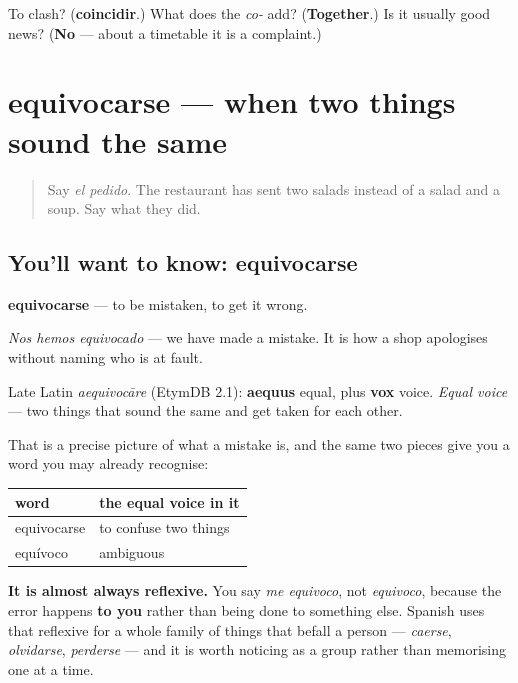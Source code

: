 \begin{tcolorbox}[breakable,colback=teal!4,colframe=teal!35!black,title={Before you move on}]
To clash? (\textbf{coincidir}.) What does the \emph{co-} add? (\textbf{Together}.) Is it usually good news? (\textbf{No} — about a timetable it is a complaint.)
\end{tcolorbox}
\section[equivocarse]{equivocarse — when two things sound the same}

\label{lesson:ES-C437-equivocarse}



\begin{quote}
Say \emph{el pedido}. The restaurant has sent two salads instead of a salad and a soup. Say what they did.
\end{quote}

\subsection*{You'll want to know: equivocarse}
\textbf{equivocarse} — to be mistaken, to get it wrong.

\emph{Nos hemos equivocado} — we have made a mistake. It is how a shop apologises without naming who is at fault.

\begin{cousinweb}
Late Latin \emph{aequivocāre} (EtymDB 2.1): \textbf{aequus} equal, plus \textbf{vox} voice. \emph{Equal voice} — two things that sound the same and get taken for each other.

That is a precise picture of what a mistake is, and the same two pieces give you a word you may already recognise:

\noindent
\begin{tabularx}{\linewidth}{@{}>{\raggedright\arraybackslash}X>{\raggedright\arraybackslash}X@{}}
\toprule
\textbf{word} & \textbf{the equal voice in it} \\
\midrule
equivocarse & to confuse two things \\
equívoco & ambiguous \\
\bottomrule
\end{tabularx}

\textbf{It is almost always reflexive.} You say \emph{me equivoco}, not \emph{equivoco}, because the error happens \textbf{to you} rather than being done to something else. Spanish uses that reflexive for a whole family of things that befall a person — \emph{caerse}, \emph{olvidarse}, \emph{perderse} — and it is worth noticing as a group rather than memorising one at a time.
\end{cousinweb}

